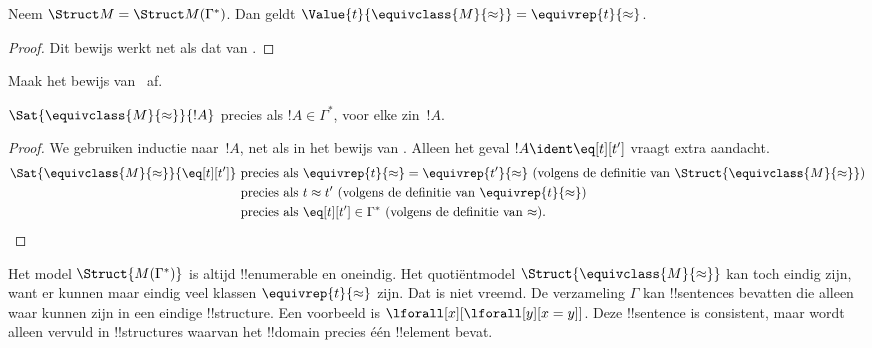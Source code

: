 \documentclass[openany]{memoir}
\begin{document}
\begin{lem} 
 Neem $\Struct M = \Struct M
 (\Gamma^*)$. Dan geldt $\Value{t}{\equivclass{M}{\approx}} = \equivrep{t}
 {\approx}$.
\end{lem}
\begin{proof} 
Dit bewijs werkt net als dat van .
\end{proof}

\begin{prob}
Maak het bewijs van~ af.
\end{prob}

\begin{lem}
$\Sat{\equivclass{M}{\approx}}{!A}$ precies als $!A \in \Gamma^*$, voor
elke zin~$!A$.
\end{lem}

\begin{proof}
We gebruiken inductie naar~$!A$, net als in het bewijs van
. Alleen het geval $!A \ident \eq[t][t']$ vraagt
extra aandacht.
\begin{align*}
\Sat{\equivclass{M}{\approx}}{\eq[t][t']} & \text{ precies als } \equivrep{t}{\approx} = \equivrep{t'}{\approx}
\text{ (volgens de definitie van $\Struct{\equivclass{M}{\approx}}$)}\\
& \text{ precies als } t \approx t' \text{ (volgens de definitie van $\equivrep{t}{\approx}$)}\\
& \text{ precies als } \eq[t][t'] \in \Gamma^* \text{ (volgens de definitie van $\approx$).}
\end{align*}
\end{proof}

\begin{digress}
Het model $\Struct{M(\Gamma^*)}$ is altijd !!{enumerable} en oneindig.
Het quotiëntmodel $\Struct{\equivclass{M}{\approx}}$ kan toch eindig zijn,
want er kunnen maar eindig veel klassen $\equivrep{t}{\approx}$ zijn.
Dat is niet vreemd. De verzameling $\Gamma$ kan !!{sentence}s bevatten
die alleen waar kunnen zijn in een eindige !!{structure}. Een voorbeeld
is $\lforall[x][\lforall[y][x = y]]$. Deze !!{sentence} is consistent,
maar wordt alleen vervuld in !!{structure}s waarvan het !!{domain}
precies één !!{element} bevat.
\end{digress}
\endgroup

\begingroup
\def\olfilename{OLP-0134}
\def\olfilepath{content/first-order-logic/completeness/}
\hypertarget{unit-OLP-0134}{}
\end{document}
